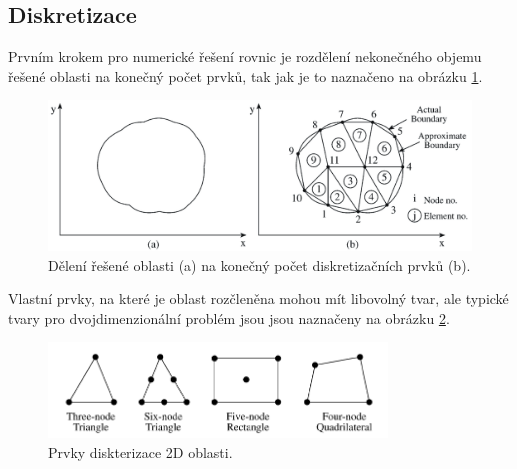 \subsection*{Diskretizace}
Prvním krokem pro numerické řešení rovnic je rozdělení nekonečného objemu řešené oblasti na konečný počet prvků, tak jak je to naznačeno na obrázku \ref{obr:sim_diskretizace}.
\begin{figure}[!h]
	\centering
	\includegraphics[width=13cm]{sim_diskretizace.png}
	\caption{Dělení řešené oblasti (a) na konečný počet diskretizačních prvků (b). \cite{num}}
	\label{obr:sim_diskretizace}
\end{figure}
Vlastní prvky, na které je oblast rozčleněna mohou mít libovolný tvar, ale typické tvary pro dvojdimenzionální problém jsou jsou naznačeny na obrázku \ref{obr:sim_prvky}.
\begin{figure}[!h]
	\centering
	\includegraphics[width=9cm]{sim_prvky.png}
	\caption{Prvky diskterizace 2D oblasti. \cite{num}}
	\label{obr:sim_prvky}
\end{figure}

